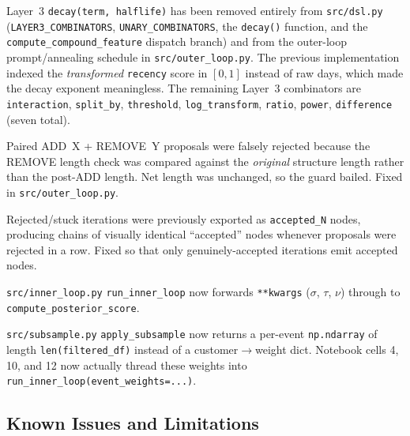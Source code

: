 \documentclass[11pt,a4paper]{article}
\begin{document}
\begin{description}[style=nextline]
\item[{{\texttt{decay}} combinator removed}.]
Layer~3 \texttt{decay(term, halflife)} has been removed entirely from \texttt{src/dsl.py} (\texttt{LAYER3\_COMBINATORS}, \texttt{UNARY\_COMBINATORS}, the \texttt{decay()} function, and the \texttt{compute\_compound\_feature} dispatch branch) and from the outer-loop prompt/annealing schedule in \texttt{src/outer\_loop.py}.  The previous implementation indexed the \emph{transformed} \texttt{recency} score in $[0,1]$ instead of raw days, which made the decay exponent meaningless.  The remaining Layer~3 combinators are \texttt{interaction}, \texttt{split\_by}, \texttt{threshold}, \texttt{log\_transform}, \texttt{ratio}, \texttt{power}, \texttt{difference} (seven total).

\item[Outer-loop \texttt{apply\_proposal} ADD+REMOVE bug.]
Paired ADD~X + REMOVE~Y proposals were falsely rejected because the REMOVE length check was compared against the \emph{original} structure length rather than the post-ADD length.  Net length was unchanged, so the guard bailed.  Fixed in \texttt{src/outer\_loop.py}.

\item[\texttt{\_export\_search\_history} viz bug.]
Rejected/stuck iterations were previously exported as \texttt{accepted\_N} nodes, producing chains of visually identical ``accepted'' nodes whenever proposals were rejected in a row.  Fixed so that only genuinely-accepted iterations emit accepted nodes.

\item[Inner-loop prior kwargs forwarding.]
\texttt{src/inner\_loop.py} \texttt{run\_inner\_loop} now forwards \texttt{**kwargs} ($\sigma$, $\tau$, $\nu$) through to \texttt{compute\_posterior\_score}.

\item[Subsample event weights.]
\texttt{src/subsample.py} \texttt{apply\_subsample} now returns a per-event \texttt{np.ndarray} of length \texttt{len(filtered\_df)} instead of a customer$\to$weight dict.  Notebook cells 4, 10, and 12 now actually thread these weights into \texttt{run\_inner\_loop(event\_weights=...)}.

\end{description}

\subsection{Known Issues and Limitations}
\end{document}
